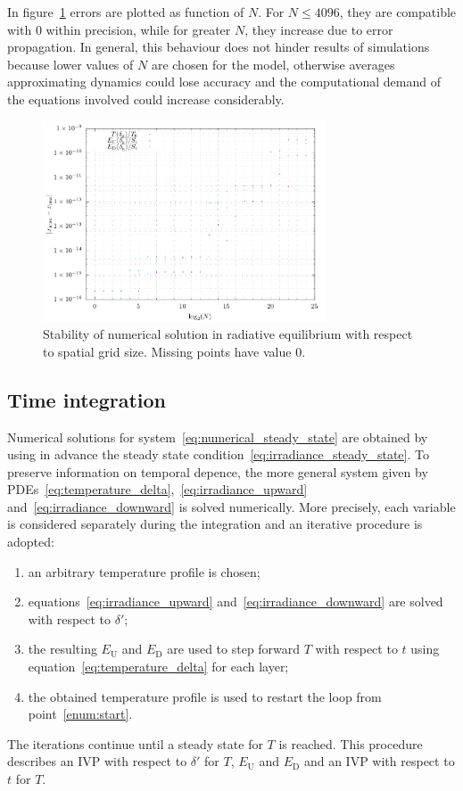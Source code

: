 \documentclass[a4paper,10pt,twocolumn,\classoptions]{article}
\begin{document}
In figure~\ref{fig:stability} errors are plotted as function of $N$. For $N \leq 4096$, they are compatible with 0 within precision, while for greater $N$, they increase due to error propagation. In general, this behaviour does not hinder results of simulations because lower values of $N$ are chosen for the model, otherwise averages approximating dynamics could lose accuracy and the computational demand of the equations involved could increase considerably.
\begin{figure}[h]
  \centering
  \includegraphics*[keepaspectratio=true,width=0.75\textwidth]{stability}
  \caption{Stability of numerical solution in radiative equilibrium with respect to spatial grid size. Missing points have value 0.}
  \label{fig:stability}
\end{figure}



\subsection{Time integration}
\label{sec:Time integration}
Numerical solutions for system~\eqref{eq:numerical_steady_state} are obtained by using in advance the steady state condition~\eqref{eq:irradiance_steady_state}. To preserve information on temporal depence, the more general system given by PDEs~\eqref{eq:temperature_delta},~\eqref{eq:irradiance_upward} and~\eqref{eq:irradiance_downward} is solved numerically.
More precisely, each variable is considered separately during the integration and an iterative procedure is adopted:
\begin{enumerate}
  \item \label{enum:start} an arbitrary temperature profile is chosen;
  \item equations~\eqref{eq:irradiance_upward} and~\eqref{eq:irradiance_downward} are solved with respect to $\delta'$;
  \item the resulting $E_\text{U}$ and $E_\text{D}$ are used to step forward $T$ with respect to $t$ using equation~\eqref{eq:temperature_delta} for each layer;
  \item the obtained temperature profile is used to restart the loop from point~\ref{enum:start}.
\end{enumerate}
The iterations continue until a steady state for $T$ is reached. This procedure describes an IVP with respect to $\delta'$ for $T$, $E_\text{U}$ and $E_\text{D}$ and an IVP with respect to $t$ for $T$.
\end{document}
